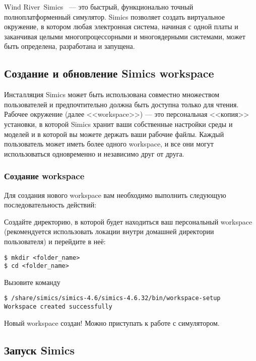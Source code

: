 Wind River\textregistered\ Simics~\cite{getting-started} --- это быстрый, функционально точный полноплатформенный симулятор. Simics позволяет создать виртуальное окружение, в котором любая электронная система, начиная с одной платы и заканчивая целыми многопроцессорными и многоядерными системами, может быть определена, разработана и запущена.

\subsection{Создание и обновление Simics workspace}

Инсталляция Simics может быть использована совместно множеством пользователей и предпочтительно должна быть доступна только для чтения. Рабочее окружение (далее <<workspace>>) --- это персональная <<копия>> установки, в которой Simics хранит ваши собственные настройки среды и моделей и в которой вы можете держать ваши рабочие файлы. Каждый пользователь может иметь более одного workspace, и все они могут использоваться одновременно и независимо друг от друга.

\subsubsection{Создание workspace}

Для создания нового workspace вам необходимо выполнить следующую последовательность действий:

\begin{enumerate*}
    \item Создайте директорию, в которой будет находиться ваш персональный workspace (рекомендуется использовать локации внутри домашней директории пользователя) и перейдите в неё:

\begin{lstlisting}
$ mkdir <folder_name>
$ cd <folder_name>
\end{lstlisting}
    \item Вызовите команду
\begin{lstlisting}
$ /share/simics/simics-4.6/simics-4.6.32/bin/workspace-setup
Workspace created successfully
\end{lstlisting}
\end{enumerate*}

Новый workspace создан! Можно приступать к работе с симулятором.

\subsection{Запуск Simics}

